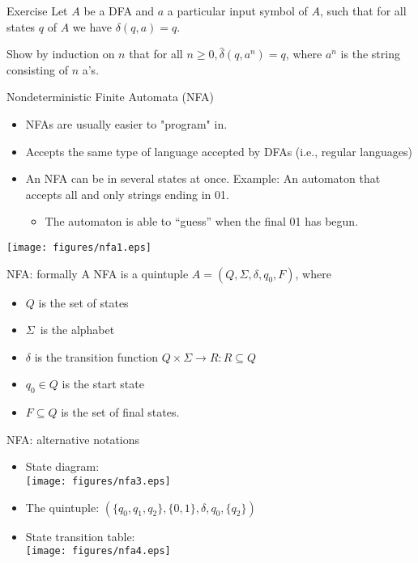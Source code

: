 \documentclass{prosper}%
\newcommand{\sg}{{\mbox{$\Sigma$}}}
\begin{document}
\begin{slide}{Exercise}
Let $A$ be a DFA and $a$ a particular input symbol of $A$, such that for all states $q$ of $A$ we have $\delta(q,a)=q$.

Show by induction on $n$ that for all $n\geq0,\hat{\delta}(q,a^n)=q$, where $a^n$ is the string consisting of $n$ a's.
\end{slide}

\begin{slide}{Nondeterministic Finite Automata  (NFA)}
\begin{itemize}
\item NFAs are usually easier to "program" in.
\item Accepts the same type of language accepted by DFAs (i.e., regular languages)
\item An NFA can be in several states at once. Example: An automaton that accepts all and only strings ending in 01.
\begin{itemize}
\item The automaton is able to ``guess'' when the final 01 has begun.
\end{itemize}
\end{itemize}
\begin{center}
\texttt{[image: figures/nfa1.eps]}
\end{center}
\end{slide}

\begin{slide}{NFA: formally}
A NFA is a quintuple $A=(Q, \sg,\delta, q_0, F)$, where
\begin{itemize}
\item $Q$ is the set of states
\item \sg\ is the alphabet
\item $\delta$ is the transition function $Q\times\sg \rightarrow R: R\subseteq Q$
\item $q_0\in Q$ is the start state
\item$F \subseteq Q$ is the set of final states.
\end{itemize}
\end{slide}


\begin{slide}{NFA: alternative notations}
\begin{itemize}
\item State diagram:\\  \texttt{[image: figures/nfa3.eps]}
\item The quintuple: \(
(\{q_0, q_1, q_2\}, \{0,1\}, \delta, q_0, \{q_2\})
\)
\item State transition table:\\ \texttt{[image: figures/nfa4.eps]}
\end{itemize}
\end{slide}
\end{document}
